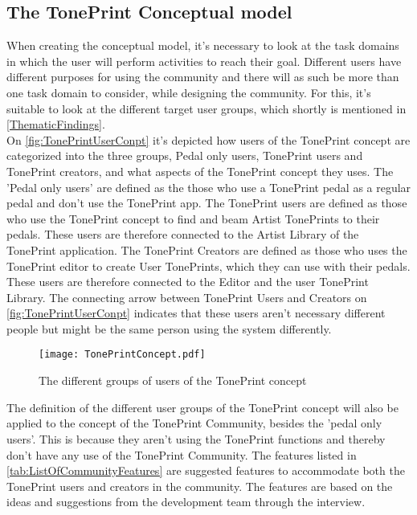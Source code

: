\subsection{The TonePrint Conceptual model}
\label{TonePrintConceptualModel}
When creating the conceptual model, it's necessary to look at the task domains in which the user will perform activities to reach their goal. Different users have different purposes for using the community and there will as such be more than one task domain to consider, while designing the community. For this, it's suitable to look at the different target user groups, which shortly is mentioned in \autoref{ThematicFindings}.\\
On \autoref{fig:TonePrintUserConpt} it's depicted how users of the TonePrint concept are categorized into the three groups, Pedal only users, TonePrint users and TonePrint creators, and what aspects of the TonePrint concept they uses. The 'Pedal only users' are defined as the those who use a TonePrint pedal as a regular pedal and don't use the TonePrint app. The TonePrint users are defined as those who use the TonePrint concept to find and beam Artist TonePrints to their pedals. These users are therefore connected to the Artist Library of the TonePrint application. The TonePrint Creators are defined as those who uses the TonePrint editor to create User TonePrints, which they can use with their pedals. These users are therefore connected to the Editor and the user TonePrint Library. The connecting arrow between TonePrint Users and Creators on \autoref{fig:TonePrintUserConpt} indicates that these users aren't necessary different people but might be the same person using the system differently. 

\begin{figure}[H]
	\centering
	\texttt{[image: TonePrintConcept.pdf]}
	\caption{The different groups of users of the TonePrint concept}
	\label{fig:TonePrintUserConpt}
\end{figure}

\noindent
The definition of the different user groups of the TonePrint concept will also be applied to the concept of the TonePrint Community, besides the 'pedal only users'. This is because they aren't using the TonePrint functions and thereby don't have any use of the TonePrint Community. The features listed in \autoref{tab:ListOfCommunityFeatures} are suggested features to accommodate both the TonePrint users and creators in the community. The features are based on the ideas and suggestions from the development team through the interview.

